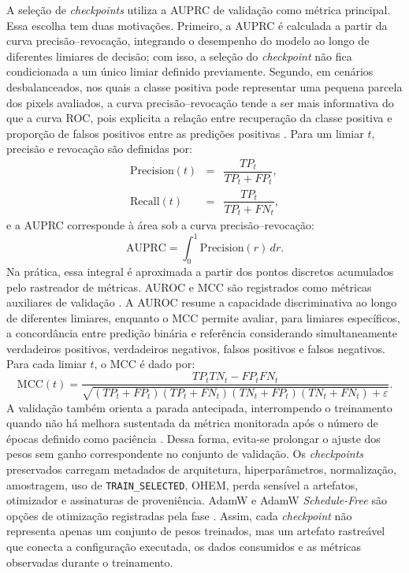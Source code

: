A seleção de \textit{checkpoints} utiliza a AUPRC de validação como métrica principal. Essa escolha tem duas motivações. Primeiro, a AUPRC é calculada a partir da curva precisão--revocação, integrando o desempenho do modelo ao longo de diferentes limiares de decisão; com isso, a seleção do \textit{checkpoint} não fica condicionada a um único limiar definido previamente. Segundo, em cenários desbalanceados, nos quais a classe positiva pode representar uma pequena parcela dos pixels avaliados, a curva precisão--revocação tende a ser mais informativa do que a curva ROC, pois explicita a relação entre recuperação da classe positiva e proporção de falsos positivos entre as predições positivas \cite{saito2015precision}. Para um limiar $t$, precisão e revocação são definidas por: \begin{equation} \begin{array}{rcl} \mathrm{Precision}(t) &=& \dfrac{TP_t}{TP_t+FP_t},\\[0.6em] \mathrm{Recall}(t) &=& \dfrac{TP_t}{TP_t+FN_t}, \end{array} \label{eq:precision_recall} \end{equation} e a AUPRC corresponde à área sob a curva precisão--revocação: \begin{equation} \mathrm{AUPRC} = \int_0^1 \mathrm{Precision}(r)\,dr . \label{eq:auprc} \end{equation} Na prática, essa integral é aproximada a partir dos pontos discretos acumulados pelo rastreador de métricas. AUROC e MCC são registrados como métricas auxiliares de validação \cite{fawcett2006roc,matthews1975comparison}. A AUROC resume a capacidade discriminativa ao longo de diferentes limiares, enquanto o MCC permite avaliar, para limiares específicos, a concordância entre predição binária e referência considerando simultaneamente verdadeiros positivos, verdadeiros negativos, falsos positivos e falsos negativos. Para cada limiar $t$, o MCC é dado por: \begin{equation} \mathrm{MCC}(t)= \frac{ TP_tTN_t-FP_tFN_t }{ \sqrt{ (TP_t+FP_t)(TP_t+FN_t)(TN_t+FP_t)(TN_t+FN_t)+\varepsilon } } . \label{eq:mcc_validacao} \end{equation} A validação também orienta a parada antecipada, interrompendo o treinamento quando não há melhora sustentada da métrica monitorada após o número de épocas definido como paciência \cite{prechelt1998automatic}. Dessa forma, evita-se prolongar o ajuste dos pesos sem ganho correspondente no conjunto de validação. Os \textit{checkpoints} preservados carregam metadados de arquitetura, hiperparâmetros, normalização, amostragem, uso de \texttt{TRAIN\_SELECTED}, OHEM, perda sensível a artefatos, otimizador e assinaturas de proveniência. AdamW e AdamW \textit{Schedule-Free} são opções de otimização registradas pela fase \cite{loshchilov2019decoupled,defazio2024road}. Assim, cada \textit{checkpoint} não representa apenas um conjunto de pesos treinados, mas um artefato rastreável que conecta a configuração executada, os dados consumidos e as métricas observadas durante o treinamento.

